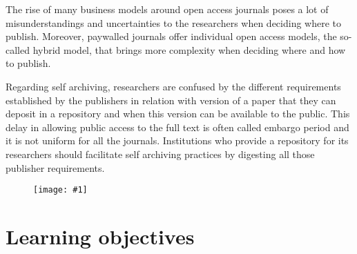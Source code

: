 \documentclass{article}
\newlength{\imgwidth}
\newcommand\scaledgraphics[2]{%
                
\settowidth{\imgwidth}{\texttt{[image: \#1]}}%
                
\setlength{\imgwidth}{\minof{\imgwidth}{#2\textwidth}}%
                
\texttt{[image: \#1]}%
                
}
\begin{document}
The rise of many business models around open access journals poses a lot of misunderstandings and uncertainties to the researchers when deciding where to publish. Moreover, paywalled journals offer individual open access models, the so-called hybrid model, that brings more complexity when deciding where and how to publish.


Regarding self archiving, researchers are confused by the different requirements established by the publishers in relation with version of a paper that they can deposit in a repository and when this version can be available to the public. This delay in allowing public access to the full text is often called embargo period and it is not uniform for all the journals. Institutions who provide a repository for its researchers should facilitate self archiving practices by digesting all those publisher requirements.

\begin{figure}
\scaledgraphics{9209bd39-910a-46c7-a66a-21a7bbfcd5f7.png}{1}
\label{F13198201}
\end{figure}


\section{Learning objectives}\label{learning-objectives}
\end{document}
